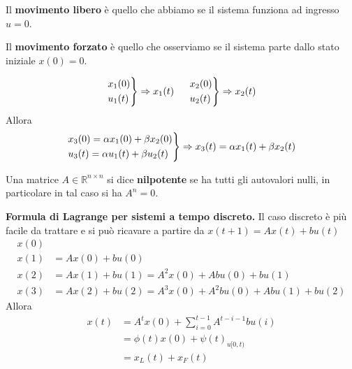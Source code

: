 \documentclass[10pt,a4paper]{book}
\begin{document}
Il \textbf{movimento libero} è quello che abbiamo se il sistema funziona ad ingresso $u=0$.

Il \textbf{movimento forzato} è quello che osserviamo se il sistema parte dallo stato iniziale $x( 0) =0$.
\begin{theorem}
\begin{equation*}
\begin{drcases}
x_1( 0)\\
u_1(t)
\end{drcases} \Rightarrow x_1(t) \ \ \ \ \begin{drcases}
x_2( 0)\\
u_2(t)
\end{drcases} \Rightarrow x_2(t)
\end{equation*}
Allora
\begin{equation*}
\begin{drcases}
x_3( 0) =\alpha x_1( 0) +\beta x_2( 0)\\
u_3(t) =\alpha u_1(t) +\beta u_2(t)
\end{drcases} \Rightarrow x_3(t) =\alpha x_1(t) +\beta x_2(t)
\end{equation*}
\end{theorem}
\begin{ricalg}
Una matrice $A\in \mathbb{R}^{n\times n}$ si dice \textbf{nilpotente} se ha tutti gli autovalori nulli, in particolare in tal caso si ha $A^{n} =0$.
\end{ricalg}
\textbf{Formula di Lagrange per sistemi a tempo discreto.} Il caso discreto è più facile da trattare e si può ricavare a partire da $x(t+1)=Ax(t)+bu(t)$
\begin{equation*}
\begin{aligned}
x( 0) & \\
x( 1) & =Ax( 0) +bu( 0)\\
x( 2) & =Ax( 1) +bu( 1) =A^{2} x( 0) +Abu( 0) +bu( 1)\\
x( 3) & =Ax( 2) +bu( 2) =A^{3} x( 0) +A^{2} bu( 0) +Abu( 1) +bu( 2)
\end{aligned}
\end{equation*}
Allora
\begin{equation}
\boxed{\begin{aligned}
x(t) & =A^{t} x( 0) +\sum\limits ^{t-1}_{i=0} A^{t-i-1} bu( i)\\
 & =\phi (t) x( 0) +\psi (t)_{u[ 0,t)}\\
 & =x_L(t) +x_F(t)
\end{aligned}}
\end{equation}
\end{document}
